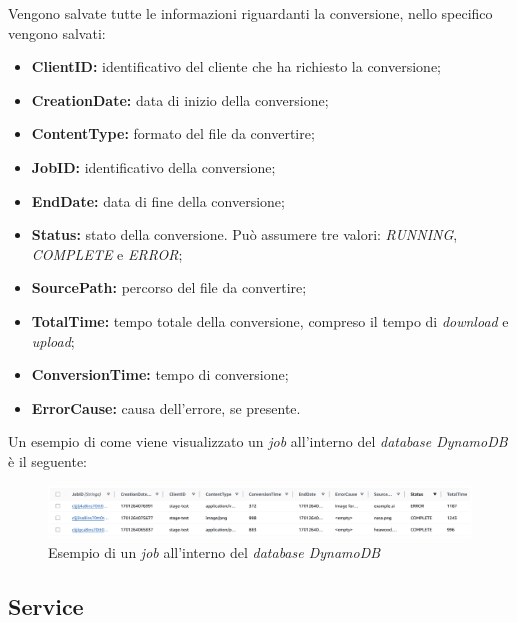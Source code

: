 Vengono salvate tutte le informazioni riguardanti la conversione, nello
specifico vengono salvati:
\begin{itemize}
      \item \textbf{ClientID:} identificativo del cliente che ha richiesto la
            conversione;
      \item \textbf{CreationDate:} data di inizio della conversione;
      \item \textbf{ContentType:} formato del file da convertire;
      \item \textbf{JobID:} identificativo della conversione;
      \item \textbf{EndDate:} data di fine della conversione;
      \item \textbf{Status:} stato della conversione. Può assumere tre valori: \emph{RUNNING}, \emph{COMPLETE} e \emph{ERROR};
      \item \textbf{SourcePath:} percorso del file da convertire;
      \item \textbf{TotalTime:} tempo totale della conversione, compreso il tempo
            di \emph{download} e \emph{upload};
      \item \textbf{ConversionTime:} tempo di conversione;
      \item \textbf{ErrorCause:} causa dell'errore, se presente.
\end{itemize}

Un esempio di come viene visualizzato un \emph{job} all'interno del
\emph{database DynamoDB} è il seguente:
\begin{figure}[H]
      \centering
      \includegraphics[width=1\textwidth]{images/esempio-job-dynamo.png}
      \caption{Esempio di un \emph{job} all'interno del \emph{database DynamoDB}}
\end{figure}


\subsection{Service}


